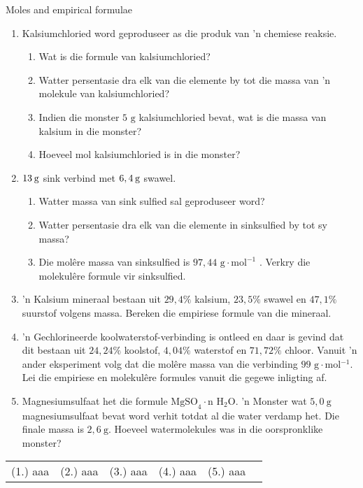             \begin{exercises}{Moles and empirical formulae}
      \label{m38712*id281924}\begin{enumerate}[noitemsep, label=\textbf{\arabic*}. ] 
            \label{m38712*uid73}\item Kalsiumchloried word geproduseer as die produk van 'n chemiese reaksie.
\label{m38712*id281940}\begin{enumerate}[noitemsep, label=\textbf{\alph*}. ] 
            \label{m38712*uid74}\item Wat is die formule van kalsiumchloried?
\label{m38712*uid75}\item Watter persentasie dra elk van die elemente by tot die massa van 'n molekule van kalsiumchloried?
\label{m38712*uid76}\item Indien die monster $5 \text{ g}$ kalsiumchloried bevat, wat is die massa van kalsium in die monster?
\label{m38712*uid77}\item Hoeveel mol kalsiumchloried is in die monster?
\end{enumerate}
                \label{m38712*uid78}\item $13\phantom{\rule{2pt}{0ex}}\text{g}$ sink verbind met $6,4\phantom{\rule{2pt}{0ex}}\text{g}$ swawel.
\label{m38712*id282007}\begin{enumerate}[noitemsep, label=\textbf{\alph*}. ] 
\item Watter massa van sink sulfied sal geproduseer word?
\item Watter persentasie dra elk van die elemente in sinksulfied by tot sy massa?
\item Die mol\^ere massa van sinksulfied is $97,44 \text{ g} \cdot \text{mol}^{−1}$ . Verkry die molekul\^ere formule vir sinksulfied.
\end{enumerate}
                \label{m38712*uid82}\item 'n Kalsium mineraal bestaan ​​uit $29,4\%$ kalsium, $23,5\%$ swawel en $47,1\%$ suurstof volgens massa. Bereken die empiriese formule van die mineraal.
\label{m38712*uid83}\item 'n Gechlorineerde koolwaterstof-verbinding is ontleed en daar is gevind dat dit bestaan ​​uit $24,24\%$ koolstof, $4,04\%$ waterstof en $71,72\%$ chloor. Vanuit  'n ander eksperiment volg dat die mol\^ere massa van die verbinding $99\text{ g} \cdot \text{mol}{}^{-1}$. Lei die empiriese en molekulêre formules vanuit die gegewe inligting af.
\item Magnesiumsulfaat het die formule $\text{MgSO}_{4} \cdot \text{n H}_{2}\text{O}$. 'n Monster wat $5,0 ~\text{g}$ magnesiumsulfaat bevat word verhit totdat al die water verdamp het. Die finale massa is $2,6~\text{g}$. Hoeveel watermolekules was in die oorspronklike monster? 
\end{enumerate}
\practiceinfo
\par 
 \par \begin{tabular}[h]{cccccc}
 (1.) aaa  &  (2.) aaa  &  (3.) aaa  &  (4.) aaa  & (5.) aaa \end{tabular}
\end{exercises}
